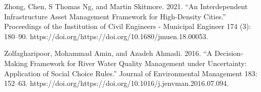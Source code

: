 \documentclass[utf8]{gradu3}
\begin{document}
Zhong, Chen, S Thomas Ng, and Martin Skitmore. 2021. “An Interdependent Infrastructure Asset Management Framework for High-Density Cities.” Proceedings of the Institution of Civil Engineers - Municipal Engineer 174 (3): 180–90. https://doi.org/https://doi.org/10.1680/jmuen.18.00053.

Zolfagharipoor, Mohammad Amin, and Azadeh Ahmadi. 2016. 
“A Decision-Making Framework for River Water Quality Management under Uncertainty:
Application of Social Choice Rules.” Journal of Environmental Management 183: 152–63.
https://doi.org/https://doi.org/10.1016/j.jenvman.2016.07.094.
\end{document}
